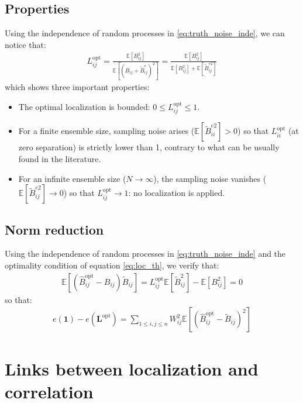 \documentclass[12pt]{scrartcl}
\begin{document}
\subsection{Properties}
Using the independence of random processes in \eqref{eq:truth_noise_inde}, we can notice that:
\begin{align}
L^\mathrm{opt}_{ij} = \frac{\mathbb{E}\left[ B^2_{ij} \right]}{\mathbb{E}\left[ \left(B_{ij} + \widetilde{B}^e_{ij}\right)^2 \right]} = \frac{\mathbb{E}\left[ B^2_{ij} \right]}{\mathbb{E}\left[ B^2_{ij} \right] + \mathbb{E}\left[ \widetilde{B}_{ij}^{e2} \right]}
\end{align}
which shows three important properties:
\begin{itemize}
\item The optimal localization is bounded: $0 \le L^\mathrm{opt}_{ij} \le 1$.
\item For a finite ensemble size, sampling noise arises ($\mathbb{E}\left[ \widetilde{B}_{ii}^{e2} \right] > 0$) so that $L^\mathrm{opt}_{ii}$ (at zero separation) is strictly lower than 1, contrary to what can be usually found in the literature.
\item For an infinite ensemble size ($N \rightarrow \infty$), the sampling noise vanishes ($\mathbb{E}\left[ \widetilde{B}_{ij}^{e2} \right] \rightarrow 0$) so that $L^\mathrm{opt}_{ij} \rightarrow 1$: no localization is applied.
\end{itemize}

\subsection{Norm reduction}
Using the independence of random processes in \eqref{eq:truth_noise_inde} and the optimality condition of equation \eqref{eq:loc_th}, we verify that:
\begin{align}
\mathbb{E}\left[\left(\widehat{B}_{ij}^\mathrm{opt} - B_{ij}\right) \widetilde{B}_{ij} \right] = L_{ij}^\mathrm{opt} \mathbb{E}\left[\widetilde{B}_{ij}^2\right] - \mathbb{E}\left[B^2_{ij} \right] = 0
\end{align}
so that:
\begin{align}
e\left(\boldsymbol{1}\right) - e\left(\mathbf{L}^\mathrm{opt}\right) = \sum_{1 \le i,j \le n} W_{ij}^2 \mathbb{E}\left[ \left(\widehat{B}_{ij}^\mathrm{opt} - \widetilde{B}_{ij}\right)^2\right]
\end{align}

\clearpage

\section{Links between localization and correlation}
\end{document}

